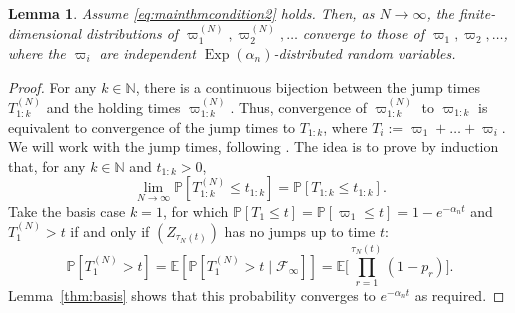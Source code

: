 \documentclass[12pt,authoryear]{article}
\newtheorem{lemma}{Lemma}
\theoremstyle{definition}
\newcommand{\Prob}{\mathbb{P}}
\newcommand{\E}{\mathbb{E}}
\newcommand{\1}[1]{\mathbbm{1}_{#1}}
\newcommand{\Exp}{\operatorname{Exp}}
\begin{document}
\begin{lemma}\label{thm:holdingtimes_distn}
Assume \eqref{eq:mainthmcondition2} holds.
Then, as $N\to\infty$, the finite-dimensional distributions of $\varpi_1^{(N)} , \varpi_2^{(N)} , \dots$ converge to those of $\varpi_1, \varpi_2, \dots$, where the $\varpi_i$ are independent $\Exp(\alpha_n)$-distributed random variables.
\end{lemma}

\begin{proof}
For any $k \in \mathbb{N}$, there is a continuous bijection between the jump times $T_{ 1 : k }^{(N)}$ and the holding times $\varpi_{ 1 : k }^{(N)}$.
Thus, convergence of $\varpi_{ 1 : k }^{(N)}$ to $\varpi_{ 1 : k }$ is equivalent to convergence of the jump times to $T_{ 1 : k }$, where $T_i := \varpi_1+\dots+\varpi_i$. 
We will work with the jump times, following \citet[Lemma 3.2]{mohle1999}.
The idea is to prove by induction that, for any $k\in\mathbb{N}$ and $t_{ 1 : k } > 0$,
\begin{equation}\label{eq:518}
\lim_{N\to\infty} \Prob\left[ T_{ 1 : k }^{(N)} \leq t_{ 1 : k } \right]
= \Prob[ T_{ 1 : k } \leq t_{ 1 : k } ] .
\end{equation}
Take the basis case $k=1$, for which $\Prob[ T_1 \leq t ] 
= \Prob[ \varpi_1 \leq t ] = 1 - e^{-\alpha_n t}$
and $T_1^{(N)} >t$ if and only if $( Z_{ \tau_N( t ) } )$ has no jumps up to time $t$:
\begin{equation*}
\Prob\left[T_1^{(N)} >t \right]
= \E\left[ \Prob[ T_1^{(N)} >t \mid \mathcal{F}_\infty ] \right]
= \E\Bigg[ \prod_{r=1}^{\tau_N(t)} (1-p_r) \Bigg] .
\end{equation*}
Lemma~\ref{thm:basis} shows that this probability converges to $e^{-\alpha_n t}$ as required.


\end{proof}
\end{document}
